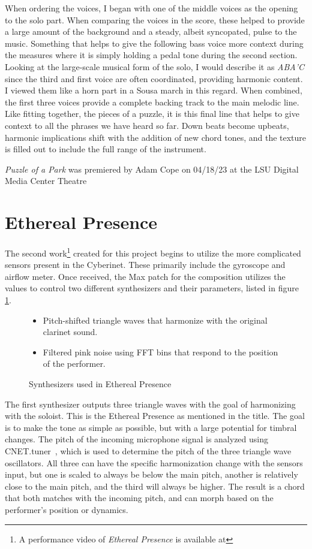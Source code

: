When ordering the voices, I began with one of the middle voices as the opening to the solo part. When comparing the voices in the score, these helped to provide a large amount of the background and a steady, albeit syncopated, pulse to the music. Something that helps to give the following bass voice more context during the measures where it is simply holding a pedal tone during the second section. Looking at the large-scale musical form of the solo, I would describe it as \emph{ABA'C} since the third and first voice are often coordinated, providing harmonic content. I viewed them like a horn part in a Sousa march in this regard. When combined, the first three voices provide a complete backing track to the main melodic line. Like fitting together, the pieces of a puzzle, it is this final line that helps to give context to all the phrases we have heard so far. Down beats become upbeats, harmonic implications shift with the addition of new chord tones, and the texture is filled out to include the full range of the instrument.

\textit{Puzzle of a Park} was premiered by Adam Cope on 04/18/23 at the LSU Digital Media Center Theatre

\section{Ethereal Presence}
The second work\footnote{A performance video of \textit{Ethereal Presence} is available at} created for this project begins to utilize the more complicated sensors present in the Cyberinet. These primarily include the gyroscope and airflow meter. Once received, the Max patch for the composition utilizes the values to control two different synthesizers and their parameters, listed in figure \ref{fig:etherealSynths}. 

\begin{figure}
    \centering
\begin{itemize}
    \item Pitch-shifted triangle waves that harmonize with the original clarinet sound.
    \item Filtered pink noise using FFT bins that respond to the position of the performer.
\end{itemize}
    \caption{Synthesizers used in Ethereal Presence}
    \label{fig:etherealSynths}
\end{figure}



The first synthesizer outputs three triangle waves with the goal of harmonizing with the soloist. This is the Ethereal Presence as mentioned in the title. The goal is to make the tone as simple as possible, but with a large potential for timbral changes. The pitch of the incoming microphone signal is analyzed using CNET.tuner~, which is used to determine the pitch of the three triangle wave oscillators. All three can have the specific harmonization change with the sensors input, but one is scaled to always be below the main pitch, another is relatively close to the main pitch, and the third will always be higher. The result is a chord that both matches with the incoming pitch, and can morph based on the performer's position or dynamics. 



